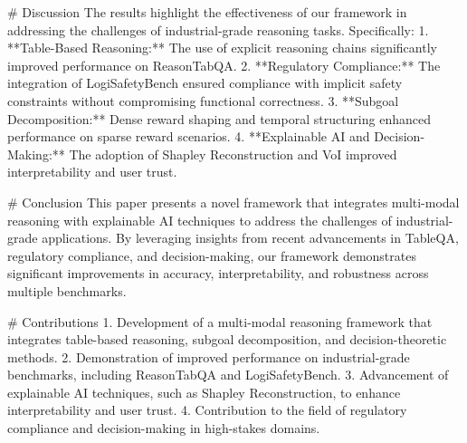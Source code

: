 # Discussion  
The results highlight the effectiveness of our framework in addressing the challenges of industrial-grade reasoning tasks. Specifically:  
1. **Table-Based Reasoning:** The use of explicit reasoning chains significantly improved performance on ReasonTabQA.  
2. **Regulatory Compliance:** The integration of LogiSafetyBench ensured compliance with implicit safety constraints without compromising functional correctness.  
3. **Subgoal Decomposition:** Dense reward shaping and temporal structuring enhanced performance on sparse reward scenarios.  
4. **Explainable AI and Decision-Making:** The adoption of Shapley Reconstruction and VoI improved interpretability and user trust.  

# Conclusion  
This paper presents a novel framework that integrates multi-modal reasoning with explainable AI techniques to address the challenges of industrial-grade applications. By leveraging insights from recent advancements in TableQA, regulatory compliance, and decision-making, our framework demonstrates significant improvements in accuracy, interpretability, and robustness across multiple benchmarks.  

# Contributions  
1. Development of a multi-modal reasoning framework that integrates table-based reasoning, subgoal decomposition, and decision-theoretic methods.  
2. Demonstration of improved performance on industrial-grade benchmarks, including ReasonTabQA and LogiSafetyBench.  
3. Advancement of explainable AI techniques, such as Shapley Reconstruction, to enhance interpretability and user trust.  
4. Contribution to the field of regulatory compliance and decision-making in high-stakes domains.  

